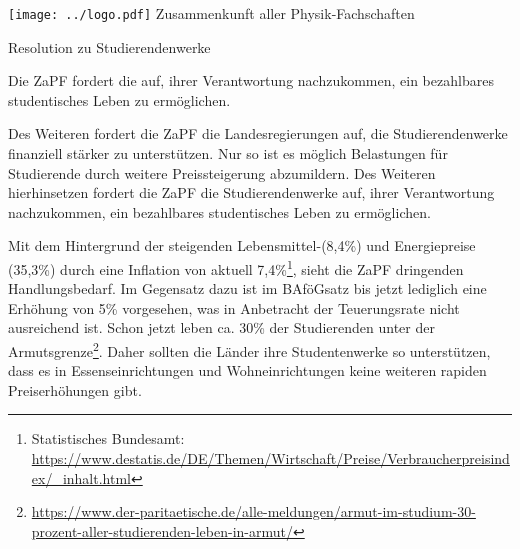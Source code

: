 \documentclass[DIV=calc]{scrartcl}
\begin{document}
\hspace{0.87\textwidth}
\begin{minipage}{120pt}
	\vspace{-1.8cm}
	\texttt{[image: ../logo.pdf]}
	\centering
	\small Zusammenkunft aller Physik-Fachschaften
\end{minipage}

\begin{center}
  \huge{Resolution zu Studierendenwerke}\vspace{.25\baselineskip}\\
  \normalsize
\end{center}
\vspace{1cm}






Die ZaPF fordert die  auf, ihrer Verantwortung nachzukommen, ein bezahlbares studentisches Leben zu ermöglichen.

Des Weiteren fordert die ZaPF die Landesregierungen auf, die Studierendenwerke finanziell stärker zu unterstützen.
Nur so ist es möglich Belastungen für Studierende durch weitere Preissteigerung abzumildern.
Des Weiteren hierhinsetzen fordert die ZaPF die Studierendenwerke auf, ihrer Verantwortung nachzukommen, ein bezahlbares studentisches Leben zu ermöglichen.

Mit dem Hintergrund der steigenden Lebensmittel-(8,4\%) und Energiepreise (35,3\%) durch eine Inflation von aktuell 7,4\%\footnote{Statistisches Bundesamt:
\url{https://www.destatis.de/DE/Themen/Wirtschaft/Preise/Verbraucherpreisindex/_inhalt.html}}, sieht die ZaPF dringenden Handlungsbedarf. Im Gegensatz dazu ist im BAföGsatz bis jetzt lediglich eine Erhöhung von 5\% vorgesehen, was in Anbetracht der Teuerungsrate nicht ausreichend ist. Schon jetzt leben ca. 30\% der Studierenden unter der Armutsgrenze\footnote{\url{https://www.der-paritaetische.de/alle-meldungen/armut-im-studium-30-prozent-aller-studierenden-leben-in-armut/}}. Daher sollten die Länder ihre Studentenwerke so unterstützen, dass es in Essenseinrichtungen und Wohneinrichtungen keine weiteren rapiden Preiserhöhungen gibt.
\end{document}
